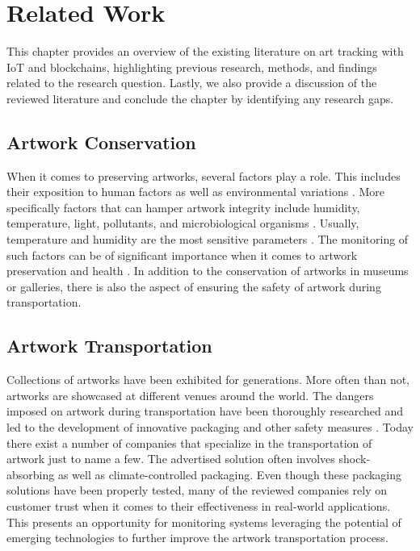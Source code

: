 \chapter{Related Work}
\label{chap:related_work}
This chapter provides an overview of the existing literature on art tracking with IoT and blockchains, highlighting previous research, methods, and findings related to the research question. Lastly, we also provide a discussion of the reviewed literature and conclude the chapter by identifying any research gaps.

\section{Artwork Conservation}
When it comes to preserving artworks, several factors play a role. This includes their exposition to human factors as well as environmental variations \cite{woodenartworkmonitoring}. More specifically factors that can hamper artwork integrity include humidity, temperature, light, pollutants, and microbiological organisms \cite{riskassessment}. Usually, temperature and humidity are the most sensitive parameters \cite{riskassessment}. The monitoring of such factors can be of significant importance when it comes to artwork preservation and health \cite{environmentmonitoring}. In addition to the conservation of artworks in museums or galleries, there is also the aspect of ensuring the safety of artwork during transportation. 

\section{Artwork Transportation}
Collections of artworks have been exhibited for generations. More often than not, artworks are showcased at different venues around the world. The dangers imposed on artwork during transportation have been thoroughly researched and led to the development of innovative packaging and other safety measures \cite{artintransit}. Today there exist a number of companies that specialize in the transportation of artwork \cite{kraftels, hasenkamp, weltifurrer} just to name a few. The advertised solution often involves shock-absorbing as well as climate-controlled packaging. Even though these packaging solutions have been properly tested, many of the reviewed companies rely on customer trust when it comes to their effectiveness in real-world applications. This presents an opportunity for monitoring systems leveraging the potential of emerging technologies to further improve the artwork transportation process.

